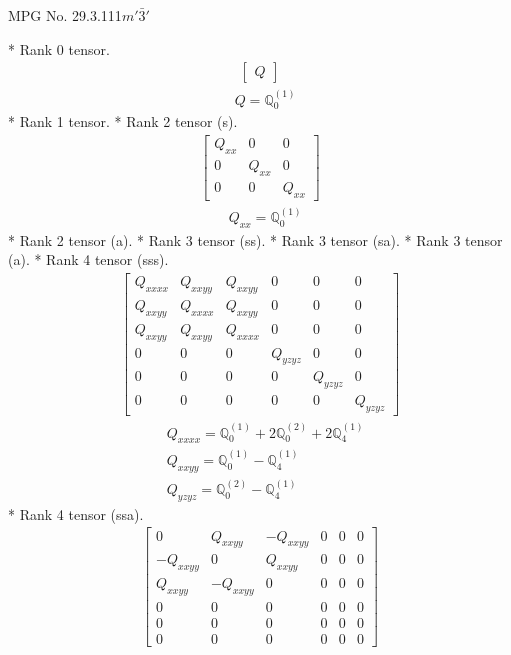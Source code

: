 \documentclass[fleqn,8pt,landscape]{jsarticle}
\begin{document}
\setcounter{MaxMatrixCols}{32}

\renewcommand{\tablename}{Table~}
\renewcommand{\figurename}{Figure~}
\begin{center}
\LARGE
MPG No. 29.3.111\quad$m'\bar{3}'$
\end{center}
* Rank 0 tensor.
\begin{align*}
\begin{bmatrix} Q \end{bmatrix}
\end{align*}
\begin{align*}
& Q = \mathbb{Q}_{0}^{(1)}
\end{align*}
* Rank 1 tensor.
* Rank 2 tensor (s).
\begin{align*}
\begin{bmatrix} Q_{xx} & 0 & 0 \\ 0 & Q_{xx} & 0 \\ 0 & 0 & Q_{xx} \end{bmatrix}
\end{align*}
\begin{align*}
& Q_{xx} = \mathbb{Q}_{0}^{(1)}
\end{align*}
* Rank 2 tensor (a).
* Rank 3 tensor (ss).
* Rank 3 tensor (sa).
* Rank 3 tensor (a).
* Rank 4 tensor (sss).
\begin{align*}
\begin{bmatrix} Q_{xxxx} & Q_{xxyy} & Q_{xxyy} & 0 & 0 & 0 \\ Q_{xxyy} & Q_{xxxx} & Q_{xxyy} & 0 & 0 & 0 \\ Q_{xxyy} & Q_{xxyy} & Q_{xxxx} & 0 & 0 & 0 \\ 0 & 0 & 0 & Q_{yzyz} & 0 & 0 \\ 0 & 0 & 0 & 0 & Q_{yzyz} & 0 \\ 0 & 0 & 0 & 0 & 0 & Q_{yzyz} \end{bmatrix}
\end{align*}
\begin{align*}
& Q_{xxxx} = \mathbb{Q}_{0}^{(1)} + 2 \mathbb{Q}_{0}^{(2)} + 2 \mathbb{Q}_{4}^{(1)} \\
& Q_{xxyy} = \mathbb{Q}_{0}^{(1)} - \mathbb{Q}_{4}^{(1)} \\
& Q_{yzyz} = \mathbb{Q}_{0}^{(2)} - \mathbb{Q}_{4}^{(1)}
\end{align*}
* Rank 4 tensor (ssa).
\begin{align*}
\begin{bmatrix} 0 & Q_{xxyy} & - Q_{xxyy} & 0 & 0 & 0 \\ - Q_{xxyy} & 0 & Q_{xxyy} & 0 & 0 & 0 \\ Q_{xxyy} & - Q_{xxyy} & 0 & 0 & 0 & 0 \\ 0 & 0 & 0 & 0 & 0 & 0 \\ 0 & 0 & 0 & 0 & 0 & 0 \\ 0 & 0 & 0 & 0 & 0 & 0 \end{bmatrix}
\end{align*}
\end{document}
